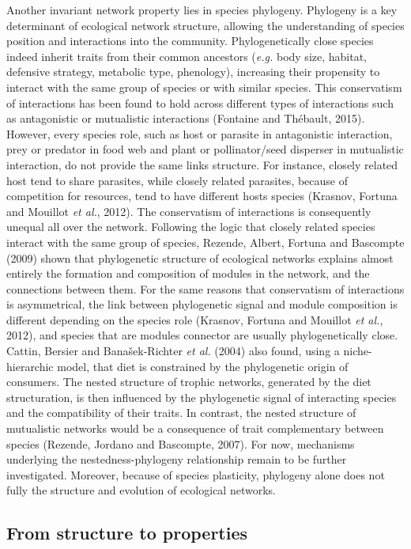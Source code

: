 \documentclass[12pt]{article}
\begin{document}
Another invariant network property lies in species phylogeny. Phylogeny
is a key determinant of ecological network structure, allowing the
understanding of species position and interactions into the community.
Phylogenetically close species indeed inherit traits from their common
ancestors (\emph{e.g.} body size, habitat, defensive strategy, metabolic
type, phenology), increasing their propensity to interact with the same
group of species or with similar species. This conservatism of
interactions has been found to hold across different types of
interactions such as antagonistic or mutualistic interactions (Fontaine
and Thébault, 2015). However, every species role, such as host or
parasite in antagonistic interaction, prey or predator in food web and
plant or pollinator/seed disperser in mutualistic interaction, do not
provide the same links structure. For instance, closely related host
tend to share parasites, while closely related parasites, because of
competition for resources, tend to have different hosts species
(Krasnov, Fortuna and Mouillot \emph{et al.}, 2012). The conservatism of
interactions is consequently unequal all over the network. Following the
logic that closely related species interact with the same group of
species, Rezende, Albert, Fortuna and Bascompte (2009) shown that
phylogenetic structure of ecological networks explains almost entirely
the formation and composition of modules in the network, and the
connections between them. For the same reasons that conservatism of
interactions is asymmetrical, the link between phylogenetic signal and
module composition is different depending on the species role (Krasnov,
Fortuna and Mouillot \emph{et al.}, 2012), and species that are modules
connector are usually phylogenetically close. Cattin, Bersier and
Banašek-Richter \emph{et al.} (2004) also found, using a
niche-hierarchic model, that diet is constrained by the phylogenetic
origin of consumers. The nested structure of trophic networks, generated
by the diet structuration, is then influenced by the phylogenetic signal
of interacting species and the compatibility of their traits. In
contrast, the nested structure of mutualistic networks would be a
consequence of trait complementary between species (Rezende, Jordano and
Bascompte, 2007). For now, mechanisms underlying the
nestedness-phylogeny relationship remain to be further investigated.
Moreover, because of species plasticity, phylogeny alone does not fully
the structure and evolution of ecological networks.

\subsection{From structure to
properties}\label{from-structure-to-properties}
\end{document}
